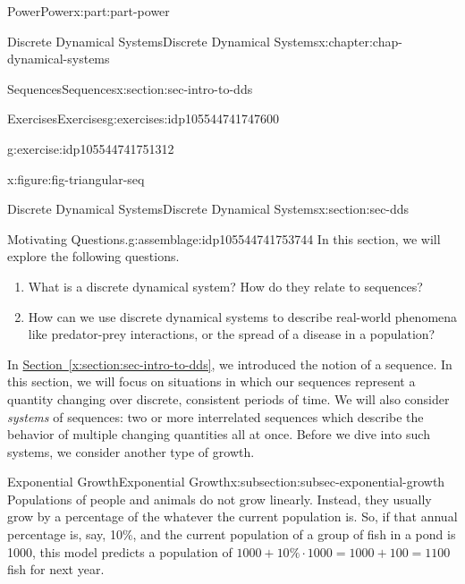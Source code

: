 \documentclass[oneside,10pt,]{book}
\newcommand{\xreffont}{\relax}
\numberwithin{equation}{section}
\begin{document}
\begin{partptx}{Power}{}{Power}{}{}{x:part:part-power}
\begin{chapterptx}{Discrete Dynamical Systems}{}{Discrete Dynamical Systems}{}{}{x:chapter:chap-dynamical-systems}
\begin{sectionptx}{Sequences}{}{Sequences}{}{}{x:section:sec-intro-to-dds}
\begin{exercises-subsection-numberless}{Exercises}{}{Exercises}{}{}{g:exercises:idp105544741747600}
\begin{divisionexercise}{3}{}{}{g:exercise:idp105544741751312}
\begin{figureptx}{}{x:figure:fig-triangular-seq}{}
\begin{image}{0}{1}{0}
\end{image}%
\tcblower
\end{figureptx}%
\end{divisionexercise}%
\end{exercises-subsection-numberless}
\end{sectionptx}
%
%
\typeout{************************************************}
\typeout{************************************************}
%
\begin{sectionptx}{Discrete Dynamical Systems}{}{Discrete Dynamical Systems}{}{}{x:section:sec-dds}
\begin{assemblage}{Motivating Questions.}{g:assemblage:idp105544741753744}%
In this section, we will explore the following questions. %
\begin{enumerate}
\item{}What is a discrete dynamical system? How do they relate to sequences?%
\item{}How can we use discrete dynamical systems to describe real-world phenomena like predator-prey interactions, or the spread of a disease in a population?%
\end{enumerate}
%
\end{assemblage}
\begin{introduction}{}%
In \hyperref[x:section:sec-intro-to-dds]{Section~{\xreffont\ref{x:section:sec-intro-to-dds}}}, we introduced the notion of a sequence. In this section, we will focus on situations in which our sequences represent a quantity changing over discrete, consistent periods of time. We will also consider \emph{systems} of sequences: two or more interrelated sequences which describe the behavior of multiple changing quantities all at once. Before we dive into such systems, we consider another type of growth.%
\end{introduction}%
%
%
\typeout{************************************************}
\typeout{************************************************}
%
\begin{subsectionptx}{Exponential Growth}{}{Exponential Growth}{}{}{x:subsection:subsec-exponential-growth}
Populations of people and animals do not grow linearly. Instead, they usually grow by a percentage of the whatever the current population is. So, if that annual percentage is, say, 10\%, and the current population of a group of fish in a pond is 1000, this model predicts a population of \(1000 + 10\%\cdot 1000 = 1000 + 100 = 1100\) fish for next year.%

\end{subsectionptx}
\end{sectionptx}
\end{chapterptx}
\end{partptx}
\end{document}

